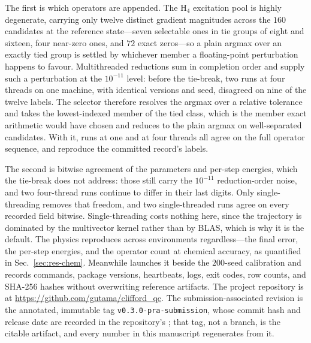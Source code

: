\documentclass[aps,pra,reprint,superscriptaddress,nofootinbib,floatfix]{revtex4-2}
\begin{document}
The first is which operators are appended. The H$_4$ excitation pool is highly degenerate, carrying only twelve distinct gradient magnitudes across the $160$ candidates at the reference state---seven selectable ones in tie groups of eight and sixteen, four near-zero ones, and $72$ exact zeros---so a plain argmax over an exactly tied group is settled by whichever member a floating-point perturbation happens to favour. Multithreaded reductions sum in completion order and supply such a perturbation at the $10^{-11}$ level: before the tie-break, two runs at four threads on one machine, with identical versions and seed, disagreed on nine of the twelve labels. The selector therefore resolves the argmax over a relative tolerance and takes the lowest-indexed member of the tied class, which is the member exact arithmetic would have chosen and reduces to the plain argmax on well-separated candidates. With it, runs at one and at four threads all agree on the full operator sequence, and reproduce the committed record's labels.

The second is bitwise agreement of the parameters and per-step energies, which the tie-break does not address: those still carry the $10^{-11}$ reduction-order noise, and two four-thread runs continue to differ in their last digits. Only single-threading removes that freedom, and two single-threaded runs agree on every recorded field bitwise. Single-threading costs nothing here, since the trajectory is dominated by the multivector kernel rather than by BLAS, which is why it is the default. The physics reproduces across environments regardless---the final error, the per-step energies, and the operator count at chemical accuracy, as quantified in Sec.~\ref{sec:res-chem}. Meanwhile  launches it beside the $200$-seed calibration and records commands, package versions, heartbeats, logs, exit codes, row counts, and SHA-256 hashes without overwriting reference artifacts. The project repository is at \url{https://github.com/gutama/clifford_qc}. The submission-associated revision is the annotated, immutable tag \texttt{v0.3.0-pra-submission}, whose commit hash and release date are recorded in the repository's ; that tag, not a branch, is the citable artifact, and every number in this manuscript regenerates from it.



\end{document}
